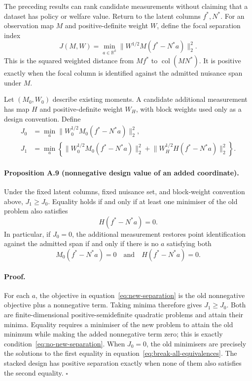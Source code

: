 The preceding results can rank candidate measurements without claiming that a
dataset has policy or welfare value. Return to the latent columns \(f^*,N^*\).
For an observation map \(M\) and positive-definite weight \(W\), define the
focal separation index
\begin{equation}
  J(M,W)
  =\min_{a\in\mathbb R^k}
    \bigl\|W^{1/2}M(f^*-N^*a)\bigr\|_2^2.
  \label{eq:separation-index}
\end{equation}
This is the squared weighted distance from \(Mf^*\) to
\(\operatorname{col}(MN^*)\). It is positive exactly when the focal column is
identified against the admitted nuisance span under \(M\).

Let \((M_0,W_0)\) describe existing moments. A candidate additional
measurement has map \(H\) and positive-definite weight \(W_H\), with block
weights used only as a design convention. Define
\begin{align}
  J_0
    &=\min_a
      \bigl\|W_0^{1/2}M_0(f^*-N^*a)\bigr\|_2^2,
    \label{eq:old-separation}\\
  J_1
    &=\min_a\left\{
      \bigl\|W_0^{1/2}M_0(f^*-N^*a)\bigr\|_2^2
      +\bigl\|W_H^{1/2}H(f^*-N^*a)\bigr\|_2^2
      \right\}.
    \label{eq:new-separation}
\end{align}

\paragraph{Proposition A.9 (nonnegative design value of an added coordinate).}
Under the fixed latent columns, fixed nuisance set, and block-weight convention
above, \(J_1\geq J_0\). Equality holds if and only if at least one minimiser of
the old problem also satisfies
\begin{equation}
  H(f^*-N^*a)=0.
  \label{eq:no-new-separation}
\end{equation}
In particular, if \(J_0=0\), the additional measurement restores point
identification against the admitted span if and only if there is no
\(a\) satisfying both
\begin{equation}
  M_0(f^*-N^*a)=0
  \quad\text{and}\quad
  H(f^*-N^*a)=0.
  \label{eq:break-all-equivalences}
\end{equation}

\paragraph{Proof.}
For each \(a\), the objective in equation~\eqref{eq:new-separation} is the old
nonnegative objective plus a nonnegative term. Taking minima therefore gives
\(J_1\geq J_0\). Both are finite-dimensional positive-semidefinite quadratic
problems and attain their minima. Equality requires a minimiser of the new
problem to attain the old minimum while making the added nonnegative term zero;
this is exactly condition~\eqref{eq:no-new-separation}. When \(J_0=0\), the
old minimisers are precisely the solutions to the first equality in
equation~\eqref{eq:break-all-equivalences}. The stacked design has positive
separation exactly when none of them also satisfies the second equality.
\(\square\)


